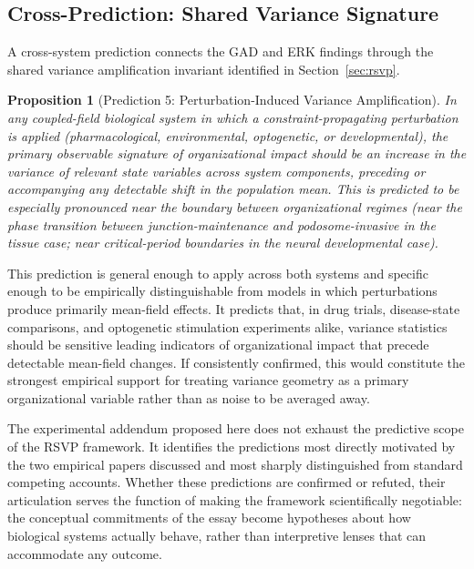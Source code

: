 \documentclass[11pt,a4paper]{article}
\theoremstyle{plain}
\newtheorem{proposition}[theorem]{Proposition}
\theoremstyle{definition}
\begin{document}
\subsection{Cross-Prediction: Shared Variance Signature}

A cross-system prediction connects the GAD and ERK findings through the shared variance
amplification invariant identified in Section~\ref{sec:rsvp}.

\begin{proposition}[Prediction 5: Perturbation-Induced Variance Amplification]
In any coupled-field biological system in which a constraint-propagating perturbation
is applied (pharmacological, environmental, optogenetic, or developmental), the primary
observable signature of organizational impact should be an increase in the variance
of relevant state variables across system components, preceding or accompanying any
detectable shift in the population mean. This is predicted to be especially pronounced
near the boundary between organizational regimes (near the phase transition between
junction-maintenance and podosome-invasive in the tissue case; near critical-period
boundaries in the neural developmental case).
\end{proposition}

This prediction is general enough to apply across both systems and specific enough to be
empirically distinguishable from models in which perturbations produce primarily mean-field
effects. It predicts that, in drug trials, disease-state comparisons, and optogenetic
stimulation experiments alike, variance statistics should be sensitive leading indicators
of organizational impact that precede detectable mean-field changes. If consistently
confirmed, this would constitute the strongest empirical support for treating variance
geometry as a primary organizational variable rather than as noise to be averaged away.

The experimental addendum proposed here does not exhaust the predictive scope of the RSVP
framework. It identifies the predictions most directly motivated by the two empirical
papers discussed and most sharply distinguished from standard competing accounts.
Whether these predictions are confirmed or refuted, their articulation serves the function
of making the framework scientifically negotiable: the conceptual commitments of the
essay become hypotheses about how biological systems actually behave, rather than
interpretive lenses that can accommodate any outcome.
\end{document}
